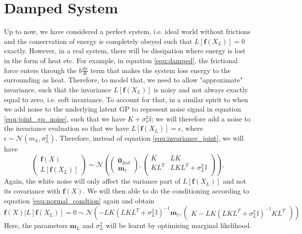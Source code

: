 \documentclass{statsmsc}
\begin{document}
\section{Damped System}
Up to now, we have considered a perfect system, i.e. ideal world without frictions and the conservation of energy is completely obeyed such that $L[\mathbf{f}(X_L)]=0$ exactly.
However, in a real system, there will be dissipation where energy is lost in the form of heat etc.  
For example, in equation \ref{equ:damped}, the frictional force enters through the $b\frac{dx}{dt}$ term that makes the system loss energy to the surrounding as heat.  
Therefore, to model that, we need to allow "approximate" invariance, such that the invariance $L[\mathbf{f}(X_L)]$ is noisy and not always exactly equal to zero, i.e. soft invariance.
To account for that, in a similar spirit to when we add noise to the underlying latent GP to represent noise signal in equation \ref{equ:joint_gp_noise}, such that we have $K+\sigma_n^2 \mathbb{I}$;
we will therefore add a noise to the invariance evaluation so that we have $L[\mathbf{f}(X_L)]=\epsilon$, where $\epsilon\sim\mathcal{N}(m_L, \sigma_L^2)$.
Therefore, instead of equation \ref{equ:invariance_joint}, we will have 
$$
\begin{pmatrix}
\mathbf{f}(X)\\L[\mathbf{f}(X_L)]
\end{pmatrix}
\sim\mathcal{N}
\left(\begin{pmatrix}\mathbf{0}_{2nd}\\\mathbf{m}_{\ell}\end{pmatrix}, \begin{pmatrix}
    K & LK \\
    KL^T & LKL^T+\sigma_L^2\mathbb{I}\\
\end{pmatrix}\right),
$$
Again, the white noise will only affect the variance part of $L[\mathbf{f}(X_L)]$ and not its covariance with $\mathbf{f}(X)$.
We will then able to do the conditioning according to equation \ref{equ:normal_condtion} again and obtain
\begin{equation}
  \mathbf{f}(X)|L[\mathbf{f}(X_L)]=0 \sim \mathcal{N} \left(-LK(LKL^T+\sigma^2_L\mathbb{I})^{-1}\mathbf{m}_\ell, \begin{pmatrix}
    K-LK(LKL^T+\sigma^2_L\mathbb{I})^{-1}KL^T
  \end{pmatrix}\right)
\label{equ:damped_invariance}
\end{equation}
Here, the parameters $\mathbf{m}_L$ and $\sigma^2_L$ will be learnt by optimising marginal likelihood. 
\end{document}
